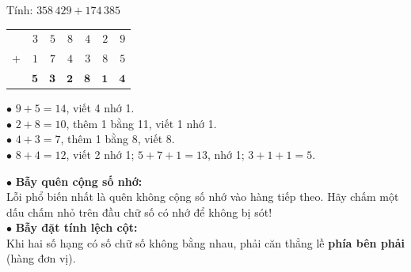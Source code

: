 \documentclass[14pt,a4paper,oneside]{extbook}
\begin{document}
\noindent
\begin{minipage}[t]{0.53\textwidth}
  \begin{tcolorbox}[
    enhanced,
    title={\footnotesize\bfseries\color{white}\faCheckCircle\ Ví dụ thực hành chuẩn mực},
    colback=green!2!white,
    colframe=green!60!black,
    arc=2.5mm, boxrule=0.8pt, top=1.8mm, bottom=1.8mm, left=2.2mm, right=2.2mm
  ]
    \footnotesize
    Tính: $358\,429 + 174\,385$\\
    \begin{center}
      \begin{tabular}{c@{\,}r@{\,}r@{\,}r@{\,}r@{\,}r@{\,}r}
        & $3$ & $5$ & $8$ & $4$ & $2$ & $9$ \\
      $+$ & $1$ & $7$ & $4$ & $3$ & $8$ & $5$ \\
      \hline
        & $\mathbf{5}$ & $\mathbf{3}$ & $\mathbf{2}$ & $\mathbf{8}$ & $\mathbf{1}$ & $\mathbf{4}$
      \end{tabular}
    \end{center}
    $\bullet$ $9 + 5 = 14$, viết 4 nhớ 1.\\
    $\bullet$ $2 + 8 = 10$, thêm 1 bằng 11, viết 1 nhớ 1.\\
    $\bullet$ $4 + 3 = 7$, thêm 1 bằng 8, viết 8.\\
    $\bullet$ $8 + 4 = 12$, viết 2 nhớ 1; $5 + 7 + 1 = 13$, nhớ 1; $3 + 1 + 1 = 5$.
  \end{tcolorbox}
\end{minipage}%
\hfill
\begin{minipage}[t]{0.45\textwidth}
  \begin{tcolorbox}[
    enhanced,
    title={\footnotesize\bfseries\color{white}\faExclamationTriangle\ Mẹo tránh bẫy trắc nghiệm},
    colback=red!2!white,
    colframe=red!70!black,
    arc=2.5mm, boxrule=0.8pt, top=1.8mm, bottom=1.8mm, left=2.2mm, right=2.2mm
  ]
    \footnotesize
    $\bullet$ \textbf{Bẫy quên cộng số nhớ:}\\
    Lỗi phổ biến nhất là quên không cộng số nhớ vào hàng tiếp theo. Hãy chấm một dấu chấm nhỏ trên đầu chữ số có nhớ để không bị sót!\\
    $\bullet$ \textbf{Bẫy đặt tính lệch cột:}\\
    Khi hai số hạng có số chữ số không bằng nhau, phải căn thẳng lề \textbf{phía bên phải} (hàng đơn vị).
  \end{tcolorbox}
\end{minipage}
\end{document}

